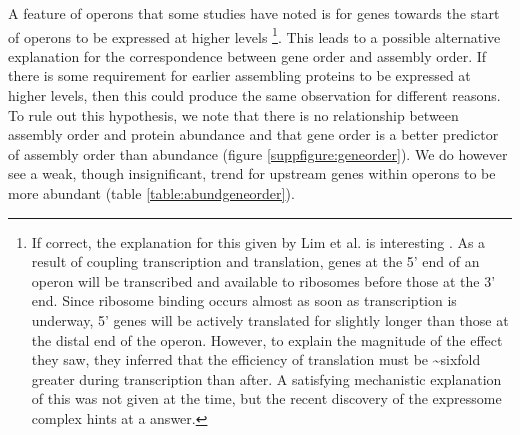 \documentclass[a4paper,11pt,twoside,openright]{scrbook}
\begin{document}
A feature of operons that some studies have noted is for genes towards the start of operons to be expressed at higher levels \cite{Nishizaki2007,Lim2011} \footnote{If correct, the explanation for this given by Lim et al. is interesting \cite{Lim2011}. As a result of coupling transcription and translation, genes at the 5' end of an operon will be transcribed and available to ribosomes before those at the 3' end. Since ribosome binding occurs almost as soon as transcription is underway, 5' genes will be actively translated for slightly longer than those at the distal end of the operon. However, to explain the magnitude of the effect they saw, they inferred that the efficiency of translation must be \textasciitilde sixfold greater during transcription than after. A satisfying mechanistic explanation of this was not given at the time, but the recent discovery of the expressome complex \cite{Kohler2017} hints at a answer.}. This leads to a possible alternative explanation for the correspondence between gene order and assembly order. If there is some requirement for earlier assembling proteins to be expressed at higher levels, then this could produce the same observation for different reasons. To rule out this hypothesis, we note that there is no relationship between assembly order and protein abundance and that gene order is a better predictor of assembly order than abundance (figure \ref{suppfigure:geneorder}). We do however see a weak, though insignificant, trend for upstream genes within operons to be more abundant (table \ref{table:abundgeneorder}).
\end{document}
